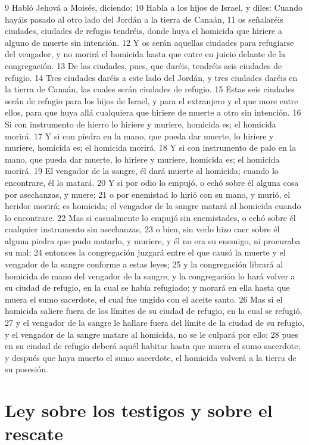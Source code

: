 9 Habló Jehová a Moisés, diciendo:
10 Habla a los hijos de Israel, y diles: Cuando hayáis pasado al otro lado del Jordán a la tierra de Canaán,
11 os señalaréis ciudades, ciudades de refugio tendréis, donde huya el homicida que hiriere a alguno de muerte sin intención.
12 Y os serán aquellas ciudades para refugiarse del vengador, y no morirá el homicida hasta que entre en juicio delante de la congregación.
13 De las ciudades, pues, que daréis, tendréis seis ciudades de refugio.
14 Tres ciudades daréis a este lado del Jordán, y tres ciudades daréis en la tierra de Canaán, las cuales serán ciudades de refugio.
15 Estas seis ciudades serán de refugio para los hijos de Israel, y para el extranjero y el que more entre ellos, para que huya allá cualquiera que hiriere de muerte a otro sin intención.
16 Si con instrumento de hierro lo hiriere y muriere, homicida es; el homicida morirá.
17 Y si con piedra en la mano, que pueda dar muerte, lo hiriere y muriere, homicida es; el homicida morirá.
18 Y si con instrumento de palo en la mano, que pueda dar muerte, lo hiriere y muriere, homicida es; el homicida morirá.
19 El vengador de la sangre, él dará muerte al homicida; cuando lo encontrare, él lo matará.
20 Y si por odio lo empujó, o echó sobre él alguna cosa por asechanzas, y muere;
21 o por enemistad lo hirió con su mano, y murió, el heridor morirá; es homicida; el vengador de la sangre matará al homicida cuando lo encontrare. 
22 Mas si casualmente lo empujó sin enemistades, o echó sobre él cualquier instrumento sin asechanzas,
23 o bien, sin verlo hizo caer sobre él alguna piedra que pudo matarlo, y muriere, y él no era su enemigo, ni procuraba su mal;
24 entonces la congregación juzgará entre el que causó la muerte y el vengador de la sangre conforme a estas leyes;
25 y la congregación librará al homicida de mano del vengador de la sangre, y la congregación lo hará volver a su ciudad de refugio, en la cual se había refugiado; y morará en ella hasta que muera el sumo sacerdote, el cual fue ungido con el aceite santo.
26 Mas si el homicida saliere fuera de los límites de su ciudad de refugio, en la cual se refugió,
27 y el vengador de la sangre le hallare fuera del límite de la ciudad de su refugio, y el vengador de la sangre matare al homicida, no se le culpará por ello;
28 pues en su ciudad de refugio deberá aquél habitar hasta que muera el sumo sacerdote; y después que haya muerto el sumo sacerdote, el homicida volverá a la tierra de su posesión.

\section*{Ley sobre los testigos y sobre el rescate}

